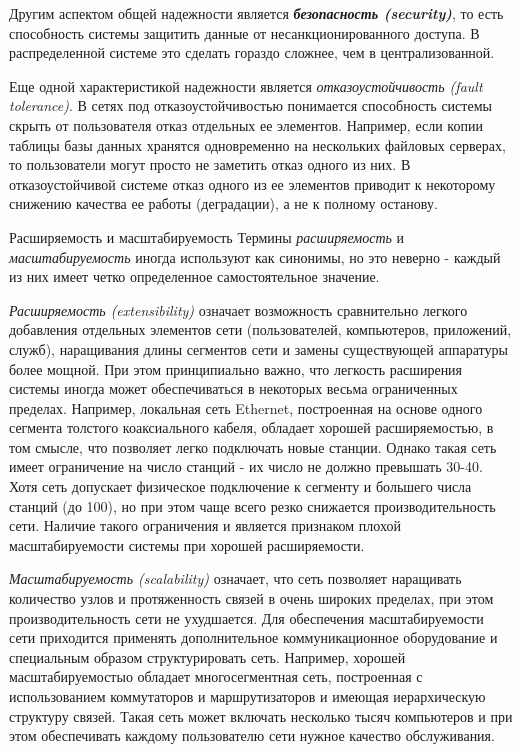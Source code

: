 Другим аспектом общей надежности является \textbf{\textit{безопасность (security)}}, то есть способность системы защитить данные от несанкционированного доступа.
В распределенной системе это сделать гораздо сложнее, чем в централизованной.

Еще одной характеристикой надежности является \emph{отказоустойчивость (fault tolerance)}.
В сетях под отказоустойчивостью понимается способность системы скрыть от пользователя отказ отдельных ее элементов.
Например, если копии таблицы базы данных хранятся одновременно на нескольких файловых серверах, то пользователи могут просто не заметить отказ одного из них.
В отказоустойчивой системе отказ одного из ее элементов приводит к некоторому снижению качества ее работы (деградации), а не к полному останову.

Расширяемость и масштабируемость
Термины \emph{расширяемость} и \emph{масштабируемость} иногда используют как синонимы, но это неверно - каждый из них имеет четко определенное самостоятельное значение.

\emph{Расширяемость (extensibility)} означает возможность сравнительно легкого добавления отдельных элементов сети (пользователей, компьютеров, приложений, служб), наращивания длины сегментов сети и замены существующей аппаратуры более мощной.
При этом принципиально важно, что легкость расширения системы иногда может обеспечиваться в некоторых весьма ограниченных пределах.
Например, локальная сеть Ethernet, построенная на основе одного сегмента толстого коаксиального кабеля, обладает хорошей расширяемостью, в том смысле, что позволяет легко подключать новые станции.
Однако такая сеть имеет ограничение на число станций - их число не должно превышать 30-40.
Хотя сеть допускает физическое подключение к сегменту и большего числа станций (до 100), но при этом чаще всего резко снижается производительность сети.
Наличие такого ограничения и является признаком плохой масштабируемости системы при хорошей расширяемости.

\emph{Масштабируемость (scalability)} означает, что сеть позволяет наращивать количество узлов и протяженность связей в очень широких пределах, при этом производительность сети не ухудшается.
Для обеспечения масштабируемости сети приходится применять дополнительное коммуникационное оборудование и специальным образом структурировать сеть.
Например, хорошей масштабируемостыо обладает многосегментная сеть, построенная с использованием коммутаторов и маршрутизаторов и имеющая иерархическую структуру связей.
Такая сеть может включать несколько тысяч компьютеров и при этом обеспечивать каждому пользователю сети нужное качество обслуживания.

